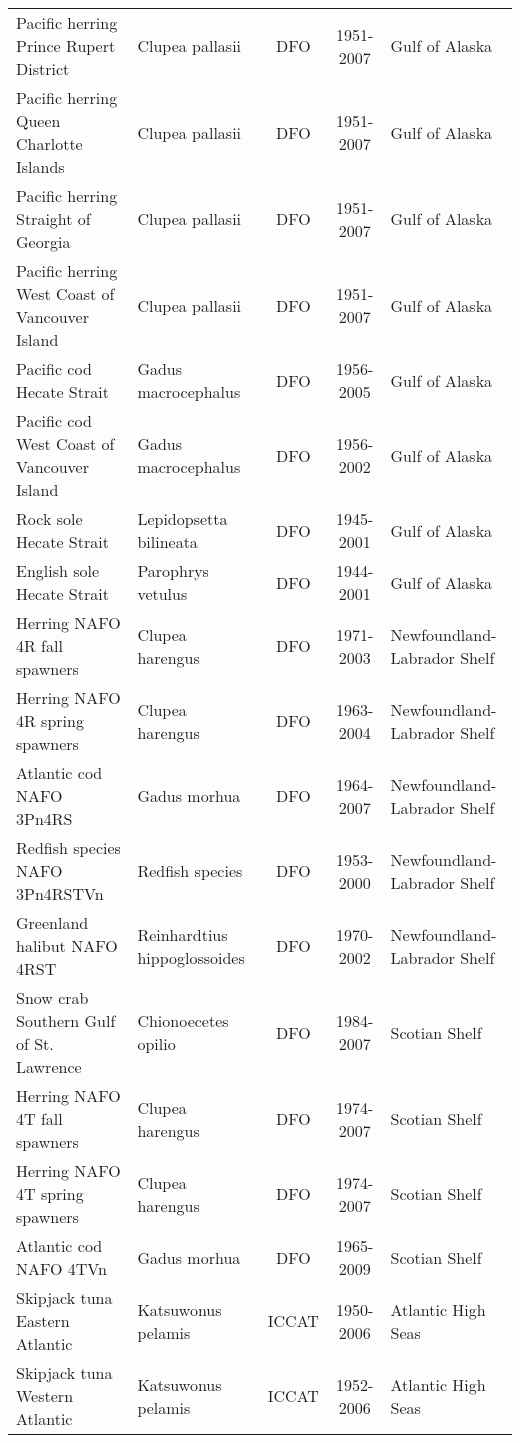 \begin{longtable}{p{4cm}p{3.5cm}ccp{5.5cm}}
  Pacific herring Prince Rupert District & Clupea pallasii & DFO & 1951-2007 & Gulf of Alaska \\ 
  Pacific herring Queen Charlotte Islands & Clupea pallasii & DFO & 1951-2007 & Gulf of Alaska \\ 
  Pacific herring Straight of Georgia & Clupea pallasii & DFO & 1951-2007 & Gulf of Alaska \\ 
  Pacific herring West Coast of Vancouver Island & Clupea pallasii & DFO & 1951-2007 & Gulf of Alaska \\ 
  Pacific cod Hecate Strait & Gadus macrocephalus & DFO & 1956-2005 & Gulf of Alaska \\ 
  Pacific cod West Coast of Vancouver Island & Gadus macrocephalus & DFO & 1956-2002 & Gulf of Alaska \\ 
  Rock sole Hecate Strait & Lepidopsetta bilineata & DFO & 1945-2001 & Gulf of Alaska \\ 
  English sole Hecate Strait & Parophrys vetulus & DFO & 1944-2001 & Gulf of Alaska \\ 
  Herring NAFO 4R fall spawners & Clupea harengus & DFO & 1971-2003 & Newfoundland-Labrador Shelf \\ 
  Herring NAFO 4R spring spawners & Clupea harengus & DFO & 1963-2004 & Newfoundland-Labrador Shelf \\ 
  Atlantic cod NAFO 3Pn4RS & Gadus morhua & DFO & 1964-2007 & Newfoundland-Labrador Shelf \\ 
  Redfish species NAFO 3Pn4RSTVn & Redfish species & DFO & 1953-2000 & Newfoundland-Labrador Shelf \\ 
  Greenland halibut NAFO 4RST & Reinhardtius hippoglossoides & DFO & 1970-2002 & Newfoundland-Labrador Shelf \\ 
  Snow crab Southern Gulf of St. Lawrence & Chionoecetes opilio & DFO & 1984-2007 & Scotian Shelf \\ 
  Herring NAFO 4T fall spawners & Clupea harengus & DFO & 1974-2007 & Scotian Shelf \\ 
  Herring NAFO 4T spring spawners & Clupea harengus & DFO & 1974-2007 & Scotian Shelf \\ 
  Atlantic cod NAFO 4TVn & Gadus morhua & DFO & 1965-2009 & Scotian Shelf \\ 
  Skipjack tuna Eastern Atlantic & Katsuwonus pelamis & ICCAT & 1950-2006 & Atlantic High Seas \\ 
  Skipjack tuna Western Atlantic & Katsuwonus pelamis & ICCAT & 1952-2006 & Atlantic High Seas \\ 

\end{longtable}
